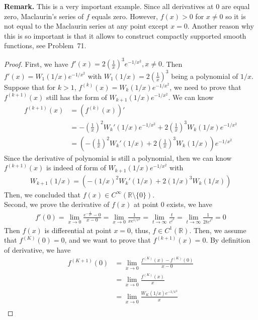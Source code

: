 \documentclass[12pt,leqno]{amsart}
\begin{document}
\noindent
{\bf Remark.}
This is a very important example. Since all derivatives at $0$ are equal zero, Maclaurin's series of $f$ equals zero. However, $f(x)>0$ for $x\neq 0$ so it is not equal to the Maclaurin series at any point except $x=0$. Another reason why this is so important is that it allows to construct compactly supported smooth functions, see Problem~71.
\begin{proof}
First, we have $f'(x) = 2\left(\frac{1}{x}\right)^3 e^{-1/x^2}, x \neq 0$. Then $f'(x) = W_1(1/x)e^{-1/x^2}$ with $W_1(1/x) = 2\left(\frac{1}{x}\right)^3$ being a polynomial of $1/x$. Suppose that for $k>1$, $f^{(k)}(x) = W_k(1/x) e^{-1/x^2}$, we need to prove that $f^{(k+1)}(x)$ still has the form of $W_{k+1}(1/x)e^{-1/x^2}$. We can know 
\begin{align*}
    f^{(k+1)}(x) & = (f^{(k)}(x))' \\
    & = -\left(\frac{1}{x}\right)^2 W_k'(1/x)e^{-1/x^2} + 2\left(\frac{1}{x}\right)^3 W_k(1/x) e^{-1/x^2} \\
    & = \left(-\left(\frac{1}{x}\right)^2 W_k'(1/x) + 2\left(\frac{1}{x}\right)^3 W_k(1/x) \right)e^{-1/x^2} 
\end{align*}
Since the derivative of polynomial is still a polynomial, then we can know $f^{(k+1)}(x)$ is indeed of form of $W_{k+1}(1/x)e^{-1/x^2}$ with
\begin{align*}
    W_{k+1}(1/x) = \left(-\left(1/x\right)^2 W_k'(1/x) + 2\left(1/x\right)^3 W_k(1/x) \right)
\end{align*}
Then, we concluded that $f(x)\in C^\infty(\mathbb{R}\setminus \{0\})$.\\
\hspace*{3em}Second, we prove the derivative of $f(x)$ at point $0$ exists, we have 
\begin{align*}
    f'(0)=\lim_{x\rightarrow 0}\frac{e^{-\frac{1}{x^2}}-0}{x-0} = \lim_{x\rightarrow 0}\frac{1}{x e^{1/x^2}} = \lim_{t\to\infty}\frac{t}{e^{t^2}} = \lim_{t\to\infty}\frac{1}{2te^{t^2}} = 0
\end{align*}
Then $f(x)$ is differential at point $x=0$, thus, $f\in C^1(\mathbb{R})$. Then, we assume that $f^{(K)}(0) = 0$, and we want to prove that $f^{(k+1)}(x) = 0$. By definition of derivative, we have 
\begin{align*}
    f^{(K+1)}(0) & = \lim_{x\to 0}\frac{f^{(K)}(x) - f^{(K)}(0)}{x - 0}\\
    & = \lim_{x\to 0}\frac{f^{(K)}(x)}{x} \\
    & = \lim_{x\to 0}\frac{W_K(1/x)e^{-1/x^2}}{x} \\

\end{align*}
\end{proof}
\end{document}

